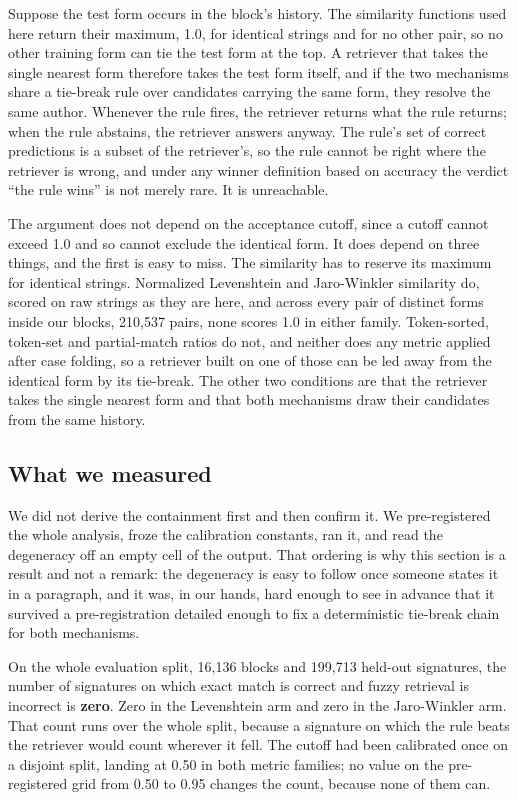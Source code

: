 \documentclass[11pt]{article}
\begin{document}
Suppose the test form occurs in the block's history. The similarity
functions used here return their maximum, 1.0, for identical strings and for
no other pair, so no other training form can tie the test form at the top. A
retriever that takes the
single nearest form therefore takes the test form itself, and if the two
mechanisms share a tie-break rule over candidates carrying the same form, they
resolve the same author. Whenever the rule fires, the retriever returns what
the rule returns; when the rule abstains, the retriever answers anyway. The
rule's set of correct predictions is a subset of the retriever's, so the rule
cannot be right where the retriever is wrong, and under any winner definition
based on accuracy the verdict ``the rule wins'' is not merely rare. It is
unreachable.

The argument does not depend on the acceptance cutoff, since a cutoff cannot
exceed 1.0 and so cannot exclude the identical form. It does depend on three
things, and the first is easy to miss. The similarity has to reserve its
maximum for identical strings. Normalized Levenshtein and Jaro-Winkler
similarity do, scored on raw strings as they are here, and across every pair
of distinct forms inside our blocks, 210{,}537 pairs, none scores 1.0 in
either family. Token-sorted, token-set and partial-match ratios do not, and
neither does any metric applied after case folding, so a retriever built on
one of those can be led away from the identical form by its tie-break. The
other two conditions are that the retriever takes the single nearest form and
that both mechanisms draw their candidates from the same history.

\subsection{What we measured}
\label{sec:degeneracy-measured}

We did not derive the containment first and then confirm it. We pre-registered
the whole analysis, froze the calibration constants, ran it, and read the
degeneracy off an empty cell of the output. That ordering is why this section
is a result and not a remark: the degeneracy is easy to follow once someone
states it in a paragraph, and it was, in our hands, hard enough to see in
advance that it survived a pre-registration detailed enough to fix a
deterministic tie-break chain for both mechanisms.

On the whole evaluation split, 16{,}136 blocks and 199{,}713 held-out
signatures, the number of signatures on which exact match is correct and fuzzy
retrieval is incorrect is \textbf{zero}. Zero in the Levenshtein arm and zero
in the Jaro-Winkler arm. That count runs over the whole split, because a
signature on which the rule beats the retriever would count wherever it fell.
The cutoff had been calibrated once on a disjoint split, landing at 0.50 in
both metric families; no value on the pre-registered grid from 0.50 to 0.95
changes the count, because none of them can.
\end{document}
